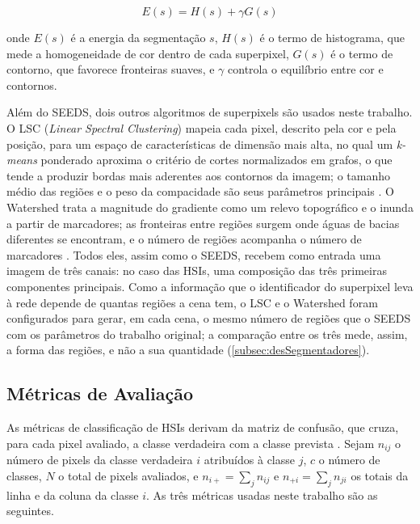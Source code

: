 \begin{equation}
E(s) = H(s) + \gamma G(s)
\end{equation}

\noindent onde $E(s)$ é a energia da segmentação $s$, $H(s)$ é o termo de histograma, que mede a homogeneidade de cor dentro de cada superpixel, $G(s)$ é o termo de contorno, que favorece fronteiras suaves, e $\gamma$ controla o equilíbrio entre cor e contornos.

Além do SEEDS, dois outros algoritmos de superpixels são usados neste trabalho. O LSC (\textit{Linear Spectral Clustering}) mapeia cada pixel, descrito pela cor e pela posição, para um espaço de características de dimensão mais alta, no qual um \textit{k-means} ponderado aproxima o critério de cortes normalizados em grafos, o que tende a produzir bordas mais aderentes aos contornos da imagem; o tamanho médio das regiões e o peso da compacidade são seus parâmetros principais \cite{Zhengqin7298741}. O Watershed trata a magnitude do gradiente como um relevo topográfico e o inunda a partir de marcadores; as fronteiras entre regiões surgem onde águas de bacias diferentes se encontram, e o número de regiões acompanha o número de marcadores \cite{Najman546254}. Todos eles, assim como o SEEDS, recebem como entrada uma imagem de três canais: no caso das HSIs, uma composição das três primeiras componentes principais. Como a informação que o identificador do superpixel leva à rede depende de quantas regiões a cena tem, o LSC e o Watershed foram configurados para gerar, em cada cena, o mesmo número de regiões que o SEEDS com os parâmetros do trabalho original; a comparação entre os três mede, assim, a forma das regiões, e não a sua quantidade (\autoref{subsec:desSegmentadores}).

\subsection{Métricas de Avaliação}

As métricas de classificação de HSIs derivam da matriz de confusão, que cruza, para cada pixel avaliado, a classe verdadeira com a classe prevista \cite{Congalton1991}. Sejam $n_{ij}$ o número de pixels da classe verdadeira $i$ atribuídos à classe $j$, $c$ o número de classes, $N$ o total de pixels avaliados, e $n_{i+} = \sum_{j} n_{ij}$ e $n_{+i} = \sum_{j} n_{ji}$ os totais da linha e da coluna da classe $i$. As três métricas usadas neste trabalho são as seguintes.

